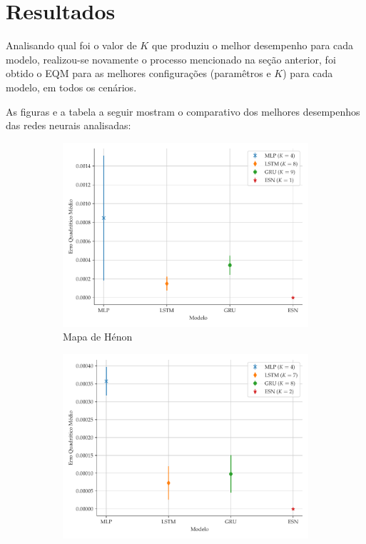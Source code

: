 \documentclass[9pt, technote]{article}
\begin{document}
\section{Resultados}

Analisando qual foi o valor de $K$ que produziu o melhor desempenho para cada modelo, realizou-se novamente o processo mencionado na seção anterior, foi obtido o EQM para as melhores configurações (paramêtros e $K$) para cada modelo, em todos os cenários. 

As figuras e a tabela a seguir mostram o comparativo dos melhores desempenhos das redes neurais analisadas:
\begin{figure}[H]
     \begin{subfigure}[t]{0.24\textwidth}
         \includegraphics[scale=0.24]{comparacao-k-henon.pdf}
         \caption{Mapa de Hénon}
     \end{subfigure}
     \centering
     \begin{subfigure}[t]{0.24\textwidth} 
         \includegraphics[scale=0.24]{comparacao-k-logistic.pdf}

\end{subfigure}
\end{figure}
\end{document}
